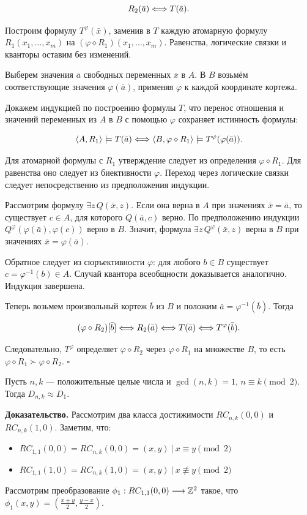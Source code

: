     $$R_2(\bar{a}) \Longleftrightarrow T(\bar{a}).$$

    Построим формулу $T^{\varphi}(\bar{x})$, заменив в $T$ каждую атомарную формулу $R_1(x_1,\dots,x_m)$ на $(\varphi\diamond R_1)(x_1,\dots,x_m)$. Равенства, логические связки и кванторы оставим без изменений.

    Выберем значения $\bar{a}$ свободных переменных $\bar{x}$ в $A$. В $B$ возьмём соответствующие значения $\varphi(\bar{a})$, применяя $\varphi$ к каждой координате кортежа.

    Докажем индукцией по построению формулы $T$, что перенос отношения и значений переменных из $A$ в $B$ с помощью $\varphi$ сохраняет истинность формулы:

    $$\langle A,R_1\rangle\models T(\bar{a})
    \Longleftrightarrow
    \langle B,\varphi\diamond R_1\rangle\models T^{\varphi}(\varphi(\bar{a})).$$

    Для атомарной формулы с $R_1$ утверждение следует из определения $\varphi\diamond R_1$. Для равенства оно следует из биективности $\varphi$. Переход через логические связки следует непосредственно из предположения индукции.

    Рассмотрим формулу $\exists z\,Q(\bar{x},z)$. Если она верна в $A$ при значениях $\bar{x}=\bar{a}$, то существует $c\in A$, для которого $Q(\bar{a},c)$ верно. По предположению индукции $Q^{\varphi}(\varphi(\bar{a}),\varphi(c))$ верно в $B$. Значит, формула $\exists z\,Q^{\varphi}(\bar{x},z)$ верна в $B$ при значениях $\bar{x}=\varphi(\bar{a})$.

    Обратное следует из сюръективности $\varphi$: для любого $b\in B$ существует $c=\varphi^{-1}(b)\in A$. Случай квантора всеобщности доказывается аналогично. Индукция завершена.

    Теперь возьмем произвольный кортеж $\bar{b}$ из $B$ и положим $\bar{a}=\varphi^{-1}(\bar{b})$. Тогда

    $$(\varphi\diamond R_2)[\bar{b}]
    \Longleftrightarrow R_2(\bar{a})
    \Longleftrightarrow T(\bar{a})
    \Longleftrightarrow T^{\varphi}(\bar{b}).$$

    Следовательно, $T^{\varphi}$ определяет $\varphi\diamond R_2$ через $\varphi\diamond R_1$ на множестве $B$, то есть $\varphi\diamond R_1 \succ \varphi\diamond R_2$. \hfill $\square$
\bs

\begin{namedLemma}
    \label{lemm:equiv_D1}
    Пусть $n,k$ --- положительные целые числа и $\gcd(n,k) = 1$, $n \equiv k \pmod 2$. Тогда $D_{n,k} \approx D_1$.
\end{namedLemma}
\textbf{Доказательство.} Рассмотрим два класса достижимости $RC_{n,k}(0,0)$ и $RC_{n,k}(1,0)$. Заметим, что:
\begin{itemize}
    \item $RC_{1,1}(0,0) = RC_{n,k}(0,0) = {(x,y)\ |\ x \equiv y \pmod{2}}$
    \item $RC_{1,1}(1,0) = RC_{n,k}(1,0) = {(x,y)\ |\ x \not \equiv y \pmod{2}}$
\end{itemize}
Рассмотрим преобразование $\phi_1: RC_{1,1}(0,0) \longrightarrow \mathbb{Z}^2$ такое, что $\phi_1(x,y) = \left(\frac{x+y}{2},\frac{y-x}{2}\right)$.


